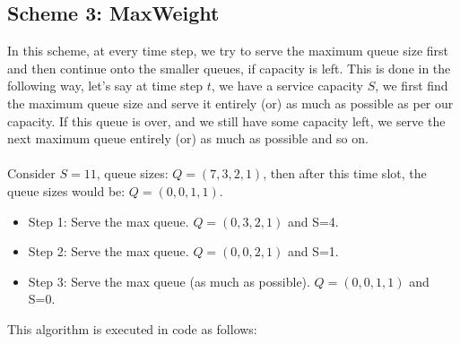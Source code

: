 \documentclass[11pt, a4paper]{article}
\begin{document}
\subsection{Scheme 3: MaxWeight}
In this scheme, at every time step, we try to serve the maximum queue size first and then continue onto the smaller queues, if capacity is left. This is done in the following way, let's say at time step $t$, we have a service capacity $S$, we first find the maximum queue size and serve it entirely (or) as much as possible as per our capacity. If this queue is over, and we still have some capacity left, we serve the next maximum queue entirely (or) as much as possible and so on. \\\\
Consider $S=11$, queue sizes: $Q = (7,3,2,1)$, then after this time slot, the queue sizes would be: $Q = (0,0,1,1)$.

\begin{itemize}
\item Step 1: Serve the max queue. $Q = (0,3,2,1)$ and S=4.
\item Step 2: Serve the max queue. $Q = (0,0,2,1)$ and S=1.
\item Step 3: Serve the max queue (as much as possible). $Q = (0,0,1,1)$ and S=0.
\end{itemize}

This algorithm is executed in code as follows:
\end{document}
